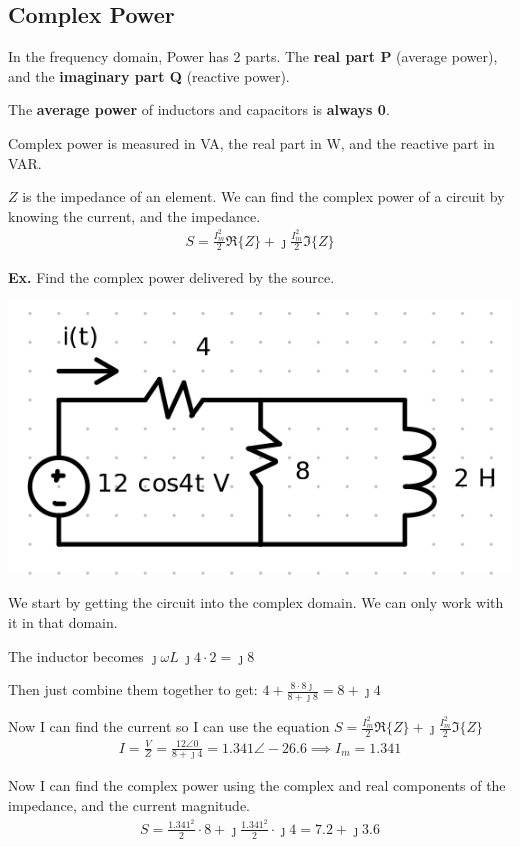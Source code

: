 \documentclass[12pt,letterpaper]{article} \usepackage{amsmath} \usepackage{graphicx} \usepackage[margin=1in]{geometry} \usepackage{longtable}  \usepackage{amssymb}
\begin{document}
	\subsection{Complex Power}
	In the frequency domain, Power has 2 parts. The \textbf{real part P} (average power), and the\textbf{ imaginary part Q} (reactive power).
	
	The \textbf{average power} of inductors and capacitors is \textbf{always 0}.
	
	Complex power is measured in VA, the real part in W, and the reactive part in VAR.
	
	$Z$ is the impedance of an element. We can find the complex power of a circuit by knowing the current, and the impedance. 
	\begin{align*}
		S = \frac{I_m^2}{2} \mathfrak{R}\{Z\} + \jmath \frac{I_m^2}{2}\mathfrak{I} \{Z\}
	\end{align*}
	
	\begin{mdframed}[]
	\textbf{Ex.} Find the complex power delivered by the source.
	\begin{center}
		\includegraphics[width=0.4\linewidth]{ex5}
	\end{center}
	We start by getting the circuit into the complex domain. We can only work with it in that domain. 
	
	The inductor becomes $\jmath \omega L \ \jmath 4 \cdot 2 =\jmath 8$
	
	Then just combine them together to get: $4+\frac{8\cdot 8\jmath}{8+\jmath 8} = 8+\jmath 4$
	
	Now I can find the current so I can use the equation $S=\frac{I_m^2}{2} \mathfrak{R}\{Z\} + \jmath \frac{I_m^2}{2}\mathfrak{I} \{Z\}$
	\begin{align*}
		I=\frac{V}{Z} = \frac{12\angle 0}{8+\jmath 4} = 1.341\angle-26.6 \implies I_m = 1.341
	\end{align*}

	Now I can find the complex power using the complex and real components of the impedance, and the current magnitude.
	\begin{align*}
		S=\frac{1.341^2}{2}\cdot 8 + \jmath \frac{1.341^2}{2}\cdot \jmath 4 = 7.2+\jmath 3.6
	\end{align*}
	\end{mdframed}
\end{document}
